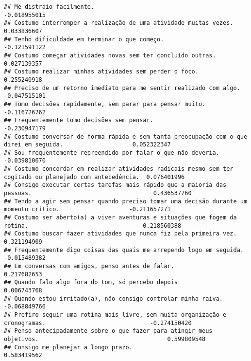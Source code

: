 \documentclass[
]{article}
\begin{document}
\begin{verbatim}
## Me distraio facilmente.                                                                                 -0.018955015
## Costumo interromper a realização de uma atividade muitas vezes.                                          0.033836607
## Tenho dificuldade em terminar o que começo.                                                             -0.121591122
## Costumo começar atividades novas sem ter concluído outras.                                               0.027139357
## Costumo realizar minhas atividades sem perder o foco.                                                    0.255240918
## Preciso de um retorno imediato para me sentir realizado com algo.                                       -0.047515101
## Tomo decisões rapidamente, sem parar para pensar muito.                                                 -0.116726762
## Frequentemente tomo decisões sem pensar.                                                                -0.230947179
## Costumo conversar de forma rápida e sem tanta preocupação com o que direi em seguida.                    0.052322347
## Sou frequentemente repreendido por falar o que não deveria.                                             -0.039810670
## Costumo concordar em realizar atividades radicais mesmo sem ter cogitado ou planejado com antecedência.  0.076401996
## Consigo executar certas tarefas mais rápido que a maioria das pessoas.                                   0.436537760
## Tendo a agir sem pensar quando preciso tomar uma decisão durante um momento crítico.                    -0.211657271
## Costumo ser aberto(a) a viver aventuras e situações que fogem da rotina.                                 0.218560388
## Costumo buscar fazer atividades que nunca fiz pela primeira vez.                                         0.321194909
## Frequentemente digo coisas das quais me arrependo logo em seguida.                                      -0.015489382
## Em conversas com amigos, penso antes de falar.                                                           0.217682653
## Quando falo algo fora do tom, só percebo depois                                                          0.006743768
## Quando estou irritado(a), não consigo controlar minha raiva.                                            -0.068849766
## Prefiro seguir uma rotina mais livre, sem muita organização e cronogramas.                              -0.274150420
## Penso antecipadamente sobre o que fazer para atingir meus objetivos.                                     0.599809548
## Consigo me planejar a longo prazo.                                                                       0.583419562

\end{verbatim}
\end{document}
